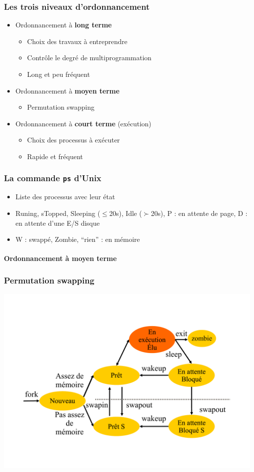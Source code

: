 \begin{frame}
\frametitle{Les trois niveaux d'ordonnancement}
\begin{itemize}
\item Ordonnancement à \textbf{long terme}
\begin{itemize}
\item Choix des travaux à entreprendre
\item Contrôle le degré de multiprogrammation
\item Long et peu fréquent
\end{itemize}
\item Ordonnancement à \textbf{moyen terme}
\begin{itemize}
\item Permutation swapping
\end{itemize}
\item Ordonnancement à \textbf{court terme} (exécution)
\begin{itemize}
\item Choix des processus à exécuter
\item Rapide et fréquent
\end{itemize}
\end{itemize}
\end{frame}


\begin{frame}
\frametitle{La commande \texttt{ps} d'Unix}
\begin{itemize}
\item Liste des processus avec leur état
\begin{center}

\end{center}
\item Runing, sTopped, Sleeping ($\leq$20s), Idle ($\succ$20s), P : en attente de page, D : en attente d'une E/S disque
\item W : swappé, Zombie, ``rien'' : en mémoire
\end{itemize}
\end{frame}


\begin{frame}
 \framesubtitle{Ordonnancement à moyen terme}
 \frametitle{Permutation swapping \cite{pase}}
 \includegraphics[width=.8\textwidth]{../illustration/permut_swap_cycle_vie.pdf}
\end{frame}



